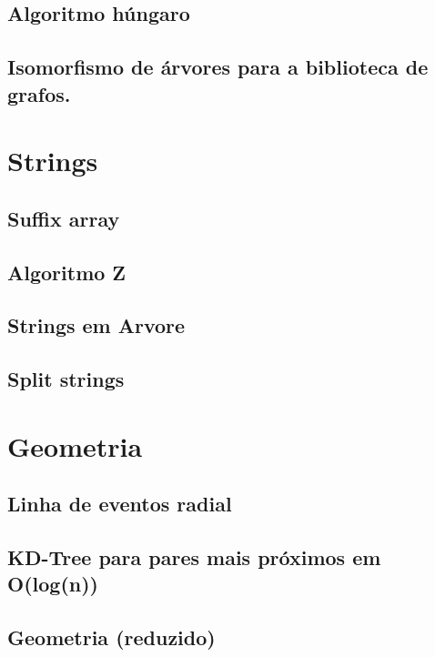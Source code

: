 \subsection{Algoritmo húngaro}
\raggedbottom
\hrulefill
\subsection{Isomorfismo de árvores para a biblioteca de grafos.}
\raggedbottom
\hrulefill
\clearpage
\section{Strings}
\subsection{Suffix array}
\raggedbottom
\hrulefill
\subsection{Algoritmo Z}
\raggedbottom
\hrulefill
\subsection{Strings em Arvore}
\raggedbottom
\hrulefill
\subsection{Split strings}
\raggedbottom
\hrulefill
\clearpage
\section{Geometria}
\subsection{Linha de eventos radial}
\raggedbottom
\hrulefill
\subsection{KD-Tree para pares mais próximos em O(log(n))}
\raggedbottom
\hrulefill
\subsection{Geometria (reduzido)}
\raggedbottom
\hrulefill
